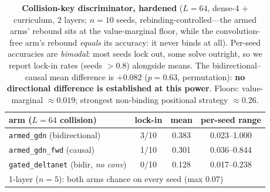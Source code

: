 \documentclass{article}
\newcommand{\armed}{\texttt{armed\_gdn}}
\newcommand{\gdn}{\texttt{gated\_deltanet}}
\begin{document}
\begin{table}[t]
\centering
\caption{\textbf{Collision-key discriminator, hardened} ($L{=}64$, dense-4 $+$ curriculum, 2 layers; $n{=}10$ seeds, rebinding-controlled---the armed arms' rebound sits at the value-marginal floor, while the convolution-free arm's rebound \emph{equals} its accuracy: it never binds at all). Per-seed accuracies are \emph{bimodal}: most seeds lock out, some solve outright, so we report lock-in rates (seeds $>0.8$) alongside means. The bidirectional--causal mean difference is $+0.082$ ($p{=}0.63$, permutation): \textbf{no directional difference is established at this power}. Floors: value-marginal $\approx 0.019$; strongest non-binding positional strategy $\approx 0.26$.}
\label{tab:collision}
\vskip 0.1in
\footnotesize
\setlength{\tabcolsep}{3.5pt}
\begin{tabular}{lccc}
\toprule
arm ($L{=}64$ collision) & lock-in & mean & per-seed range \\
\midrule
\armed{} (bidirectional) & 3/10 & 0.383 & 0.023--1.000 \\
\texttt{armed\_gdn\_fwd} (causal) & 1/10 & 0.301 & 0.036--0.844 \\
\gdn{} (bidir, \emph{no conv}) & 0/10 & 0.128 & 0.017--0.238 \\
\midrule
\multicolumn{4}{l}{\footnotesize 1-layer ($n{=}5$): both arms chance on every seed (max $0.07$)} \\
\bottomrule
\end{tabular}
\end{table}
\end{document}
